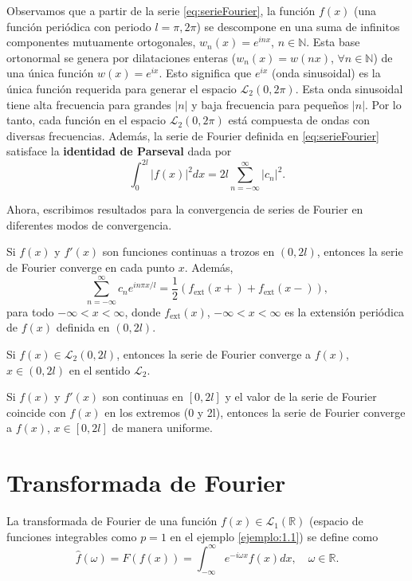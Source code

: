 \begin{multicols}{2}
Observamos que a partir de la serie \ref{eq:serieFourier}, la función $f(x)$ (una función periódica con periodo $l = \pi, 2\pi$) se descompone en una suma de infinitos componentes mutuamente ortogonales, $w_n(x) = e^{inx}$, $n \in \mathbb{N}$. Esta base ortonormal se genera por dilataciones enteras ($w_n(x) = w(nx)$, $\forall n \in \mathbb{N}$) de una única función $w(x) = e^{ix}$. Esto significa que $e^{ix}$ (onda sinusoidal) es la única función requerida para generar el espacio $\mathcal{L}_2(0, 2\pi)$. Esta onda sinusoidal tiene alta frecuencia para grandes $|n|$ y baja frecuencia para pequeños $|n|$. Por lo tanto, cada función en el espacio $\mathcal{L}_2(0, 2\pi)$ está compuesta de ondas con diversas frecuencias. Además, la serie de Fourier definida en \ref{eq:serieFourier} satisface la \textbf{identidad de Parseval} dada por
\begin{equation}
\int_0^{2l} |f(x)|^2 dx = 2l \sum_{n=-\infty}^{\infty} |c_n|^2.
\label{eq:identidadParseval}
\end{equation}

Ahora, escribimos resultados para la convergencia de series de Fourier en diferentes modos de convergencia.

\begin{teorema}
Si $f(x)$ y $f'(x)$ son funciones continuas a trozos en $(0, 2l)$, entonces la serie de Fourier converge en cada punto $x$. Además,
$$
\sum_{n=-\infty}^{\infty} c_n e^{in\pi x / l} = \frac{1}{2} \left( f_{\text{ext}}(x+) + f_{\text{ext}}(x-) \right),
$$
para todo $-\infty < x < \infty$, donde $f_{\text{ext}}(x)$, $-\infty < x < \infty$ es la extensión periódica de $f(x)$ definida en $(0, 2l)$.
\end{teorema}

\begin{teorema}
    Si $f(x) \in \mathcal{L}_2(0, 2l)$, entonces la serie de Fourier converge a $f(x)$, $x \in (0, 2l)$ en el sentido $\mathcal{L}_2$.
\end{teorema}

\begin{teorema}
    Si $f(x)$ y $f'(x)$ son continuas en $[0, 2l]$ y el valor de la serie de Fourier coincide con $f(x)$ en los extremos (0 y 2l), entonces la serie de Fourier converge a $f(x)$, $x \in [0, 2l]$ de manera uniforme.
\end{teorema}


\section{Transformada de Fourier}
La transformada de Fourier de una función $f(x) \in \mathcal{L}_1(\mathbb{R})$ (espacio de funciones integrables como $p = 1$ en el ejemplo \ref{ejemplo:1.1}) se define como
\begin{equation}
\hat{f}(\omega) = F(f(x)) = \int_{-\infty}^{\infty} e^{-i\omega x} f(x) dx, \quad \omega \in \mathbb{R}.
\label{eq:transformadaFourier}
\end{equation}


\end{multicols}

